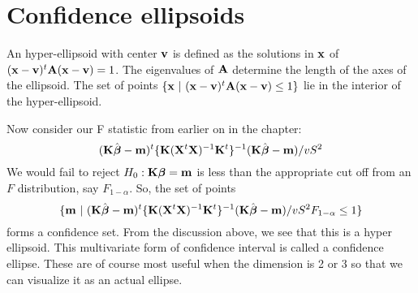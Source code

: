 \section{Confidence ellipsoids}

An hyper-ellipsoid with center $\mathbf{v}$ is defined as the solutions in $\mathbf{x}$ of 
$(\mathbf{x} - \mathbf{v})^t \mathbf{A} (\mathbf{x} - \mathbf{v})=1$. The eigenvalues of $\mathbf{A}$ determine the length
of the axes of the ellipsoid. The set of points $\{\mathbf{x} ~|~ (\mathbf{x} - \mathbf{v})^t \mathbf{A} (\mathbf{x} - \mathbf{v}) \leq 1\}$
lie in the interior of the hyper-ellipsoid. 

Now consider our F statistic from earlier on in the chapter:
$$
(\mathbf{K} \hat {\boldsymbol{\beta}} - \mathbf{m})^t  \{\mathbf{K} (\mathbf{X}^t \mathbf{X})^{-1} \mathbf{K}^t\}^{-1} (\mathbf{K} \hat {\boldsymbol{\beta}} - \mathbf{m}) / v S^2
$$
We would fail to reject $H_0:\mathbf{K} \boldsymbol{\beta} = \mathbf{m}$ is less than the appropriate cut off 
from an $F$ distribution, say $F_{1-\alpha}$. So, the set of points
$$
\{\mathbf{m} ~|~ 
(\mathbf{K} \hat {\boldsymbol{\beta}} - \mathbf{m})^t  \{\mathbf{K} (\mathbf{X}^t \mathbf{X})^{-1} \mathbf{K}^t\}^{-1} (\mathbf{K} \hat {\boldsymbol{\beta}} - \mathbf{m}) / v S^2 F_{1-\alpha} \leq 1
\}
$$
forms a confidence set. From the discussion above, we see that this is a hyper ellipsoid.
This multivariate form of confidence interval is called a confidence ellipse. These are
of course most useful when the dimension is 2 or 3 so that we can visualize it as
an actual ellipse.












